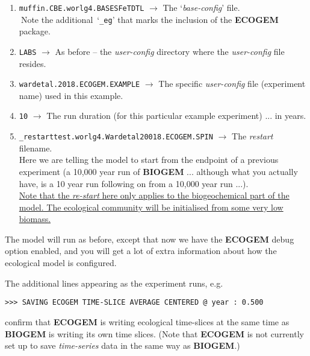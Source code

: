 \documentclass[11pt,fleqn]{book} %
\begin{document}
\begin{enumerate}[noitemsep]
\vspace{1mm}
\item \texttt{muffin.CBE.worlg4.BASESFeTDTL} $\rightarrow$ The `\textit{base-config}' file. \\
$~$\hfill Note the additional~`\texttt{\_eg}' that marks the inclusion of the \textbf{ECOGEM} package.
\vspace{1mm}
\item \texttt{LABS} $\rightarrow$ As before -- the \textit{user-config} directory where the \textit{user-config} file resides.
\vspace{1mm}
\item \texttt{wardetal.2018.ECOGEM.EXAMPLE} $\rightarrow$ The  specific \textit{user-config} file (experiment name) used in this example.
\vspace{1mm}
\item \texttt{10} $\rightarrow$ The run duration (for this particular example experiment) ... in years.
\vspace{1mm}
\item \texttt{\_restarttest.worlg4.Wardetal20018.ECOGEM.SPIN} $\rightarrow$ The \textit{restart} filename.
\\Here we are telling the model to start from the endpoint of a previous experiment (a 10,000 year run of \textbf{BIOGEM} ... although what you actually have, is a 10 year run following on from a 10,000 year run ...).
\\\uline{Note that the \textit{re-start} here only applies to the biogeochemical part of the model. The ecological community will be initialised from some very low biomass.}
\end{enumerate}
\vspace{2mm}

The model will run as before, except that now we have the \textbf{ECOGEM} debug option enabled, and you will get a lot of extra information about how the ecological model is configured.
\vspace{1mm}

The additional lines appearing as the experiment runs, e.g.
\vspace{-1mm}\small\begin{verbatim}
>>> SAVING ECOGEM TIME-SLICE AVERAGE CENTERED @ year : 0.500
\end{verbatim}\normalsize\vspace{-1mm}
confirm that \textbf{ECOGEM} is writing ecological time-slices at the same time as \textbf{BIOGEM} is writing its own time slices. (Note that \textbf{ECOGEM} is not currently set up to save \textit{time-series} data in the same way as \textbf{BIOGEM}.)
\end{document}
